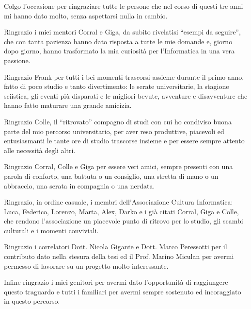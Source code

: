 
Colgo l’occasione per ringraziare tutte le persone che nel corso di questi tre anni mi hanno dato molto, senza aspettarsi nulla in cambio.

Ringrazio i miei mentori Corral e Giga, da subito rivelatisi ``esempi da seguire'', che con tanta pazienza hanno dato risposta a tutte le mie domande e, giorno dopo giorno, hanno trasformato la mia curiosità per l’Informatica in una vera passione.

Ringrazio Frank per tutti i bei momenti trascorsi assieme durante il primo anno, fatto di poco studio e tanto divertimento: le serate universitarie, la stagione sciistica, gli eventi più disparati e le migliori bevute, avventure e disavventure che hanno fatto maturare una grande amicizia.

Ringrazio Colle, il ``ritrovato'' compagno di studi con cui ho condiviso buona parte del mio percorso universitario, per aver reso produttive, piacevoli ed entusiasmanti le tante ore di studio trascorse insieme e per essere sempre attento alle necessità degli altri.

Ringrazio Corral, Colle e Giga per essere veri amici, sempre presenti con una parola di conforto, una battuta o un consiglio, una stretta di mano o un abbraccio, una serata in compagnia o una nerdata.

Ringrazio, in ordine casuale, i membri dell’Associazione Cultura Informatica: Luca, Federico, Lorenzo, Marta, Alex, Darko e i già citati Corral, Giga e Colle, che rendono l’associazione un piacevole punto di ritrovo per lo studio, gli scambi culturali e i momenti conviviali.

Ringrazio i correlatori Dott. Nicola Gigante e Dott. Marco Peressotti per il contributo dato nella stesura della tesi ed il Prof. Marino Miculan per avermi permesso di lavorare su un progetto molto interessante. 

Infine ringrazio i miei genitori per avermi dato l’opportunità di raggiungere questo traguardo e tutti i familiari per avermi sempre sostenuto ed incoraggiato in questo percorso.
